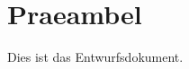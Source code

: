 \documentclass[../entwurf.tex]{subfiles}
\begin{document}
\maketitle
\tableofcontents

\clearpage

\section{Praeambel}
Dies ist das Entwurfsdokument.
\end{document}
